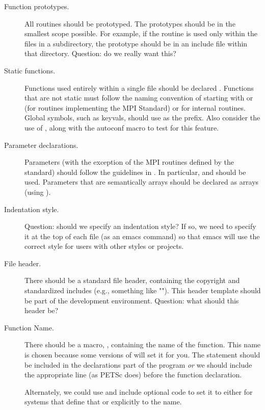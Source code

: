 \documentclass{article}
\begin{document}
\begin{description}
\item[Function prototypes.]
All routines should be prototyped.  The prototypes should be in the
smallest scope possible.  For example, if the routine is used only
within the files in a subdirectory, the prototype should be in an
include file within that directory.
Question: do we really want this?

\item[Static functions.]
Functions used entirely within a single file should be declared
.  Functions that are not static must follow the naming
convention of starting with  or  (for routines
implementing the MPI Standard) or  for internal routines.  
Global symbols, such as keyvals, should use  as the
prefix.  Also consider the use of , along with the
autoconf macro to test for this feature.

\item[Parameter declarations.]
Parameters (with the exception of the MPI routines defined by the
standard) should follow the guidelines in .  In
particular,  and  should be used.
Parameters that are semantically arrays should be declared as arrays
(using \code{[]}).  

\item[Indentation style.]
Question: should we specify an indentation style?  If so, we need to
specify it at the top of each file (as an emacs command) so that emacs
will use the correct style for users with other styles or projects.

\item[File header.]
There should be a standard file header, containing the copyright and
standardized includes (e.g., something like "").  This header
template should be part of the development environment.  Question:
what should this header be?

\item[Function Name.]
There should be a macro, , containing the name of the
function.  This name is chosen because some versions of  will set it
for you.  The statement  should be included
in the declarations part of the program \emph{or} we should include the
appropriate  line (as PETSc does) before the function
declaration. 

Alternately, we could use  and include optional code to
set it to either  for systems that define that or
explicitly to the name.


\end{description}
\end{document}
